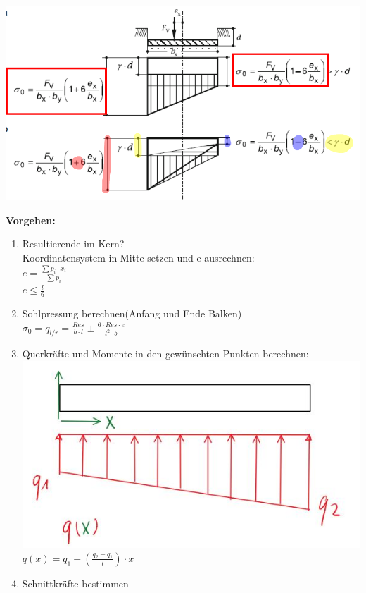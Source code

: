 \begin{multicols}{2}
	\includegraphics[width=\linewidth]{images/Flachfun6Sptrapez.PNG}
	
	\textbf{Vorgehen:}
	
	\begin{enumerate}
		\item 
		Resultierende im Kern?\\Koordinatensystem in Mitte setzen und e ausrechnen:\\
		$e=\frac{\sum p_i\cdot x_i}{\sum p_i}$\\
		$e\leq \frac{l}{6}$
		
		\item
		Sohlpressung berechnen(Anfang und Ende Balken)\\
		$\sigma_0 = q_{l/r}=\frac{Res}{b\cdot l}\pm\frac{6\cdot Res\cdot e}{l^2\cdot b} $
		
		\item 
		Querkräfte und Momente in den gewünschten Punkten berechnen:\\
		\includegraphics[width=0.7\linewidth]{images/Sohldruck}\\
		$q(x)=q_1+(\frac{q_2-q_1}{l})\cdot x$
		\item 
		Schnittkräfte bestimmen	
	\end{enumerate}
	

\end{multicols}
